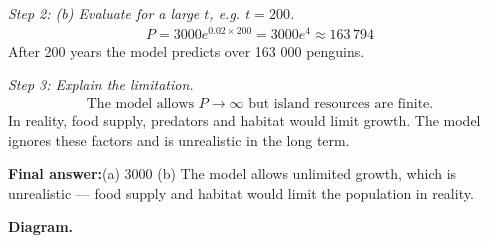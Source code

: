 \documentclass[11pt]{article}
\begin{document}
\textit{Step 2: (b) Evaluate for a large \( t \), e.g. \( t = 200 \).}
\[\begin{gathered}
P = 3000e^{0.02 \times 200} = 3000e^4 \approx 163\,794
\end{gathered}\]
After 200 years the model predicts over 163 000 penguins.

\textit{Step 3: Explain the limitation.}
\[\begin{gathered}
\text{The model allows } P \to \infty \text{ but island resources are finite.}
\end{gathered}\]
In reality, food supply, predators and habitat would limit growth. The model ignores these factors and is unrealistic in the long term.

\begin{answerbox}
\textbf{Final answer:}\quad (a) 3000 \quad  (b) The model allows unlimited growth, which is unrealistic --- food supply and habitat would limit the population in reality.
\end{answerbox}
\textbf{Diagram.}
\end{document}
